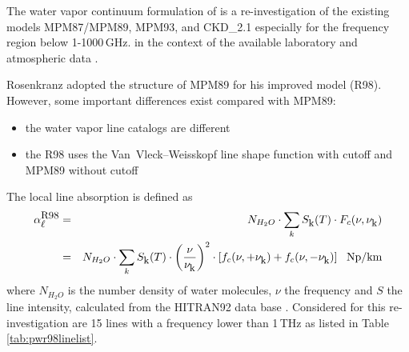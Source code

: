 {
\label{leveld:pwr98_h2o}
The water vapor continuum formulation of \citet{pwr:98} is a re-investigation 
of the existing models MPM87/MPM89, MPM93, and CKD\_2.1 especially for 
the frequency region below 1-1000\,GHz. in the context of the available
laboratory and atmospheric data \citep{abaueretal:89, abaueretal:93, 
abaueretal:95, beckerautler:46, englishetal:94, godonetal:92,
liebe:84, liebeandlayton:87, westwateretal:90}.

Rosenkranz adopted the structure of MPM89 for his improved model (R98). 
However, some important differences exist compared with MPM89:
\begin{itemize}
\item the water vapor line catalogs are different 
\item the R98 uses the Van~Vleck--Weisskopf line shape function with 
      cutoff and MPM89 without cutoff
\end{itemize}


\label{levele:pwr98_h2oline}
The local line absorption is defined as 
\begin{eqnarray} 
 \label{eq:pwr98absline}
 \alpha^{\mbox{\rm \small R98}}_{\mbox{\small $\ell$}} &=& N_{H_2O} \cdot \sum_k S_{\mbox{\rm \small k}}(T) \cdot F_{c}(\nu,\nu_{\mbox{\rm \small k}}) \nonumber\\
            &=& N_{H_2O} \cdot \sum_k S_{\mbox{\rm \small k}}(T) \cdot 
                \left (\displaystyle{\frac{\nu}{\nu_{\mbox{\rm \small k}}}}\right )^2  \cdot 
                \left [f_{c}(\nu,+\nu_{\mbox{\rm \small k}}) + f_{c}(\nu,-\nu_{\mbox{\rm \small k}}) \right]~~\mbox{Np/km}
\end{eqnarray}
where $N_{H_2O}$ is the number density of water molecules, $\nu$ the
frequency and $S$ the line intensity, calculated from the HITRAN92
data base \citet{rothman:92}. Considered for this re-investigation are 
15 lines with a frequency lower than 1\,THz as listed in 
Table \ref{tab:pwr98linelist}.

}
